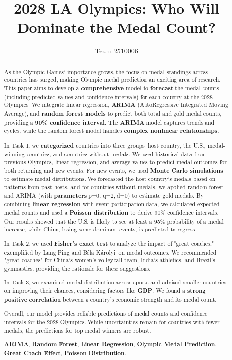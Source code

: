 \documentclass{mcmthesis}  %
\title{2028 LA Olympics: Who Will Dominate the Medal Count?}  %
\author{\small Team 2510006}  %
\begin{document}
\begin{abstract}  %

As the Olympic Games' importance grows, the focus on medal standings across countries has surged, making Olympic medal prediction an exciting area of research. This paper aims to develop a \textbf{comprehensive} model to \textbf{forecast} the medal counts (including predicted values and confidence intervals) for each country at the 2028 Olympics. We integrate linear regression, \textbf{ARIMA} (AutoRegressive Integrated Moving Average), and \textbf{random forest models} to predict both total and gold medal counts, providing a \textbf{90\% confidence interval}. The \textbf{ARIMA} model captures trends and cycles, while the random forest model handles \textbf{complex nonlinear relationships}.

In Task 1, we \textbf{categorized} countries into three groups: host country, the U.S., medal-winning countries, and countries without medals. We used historical data from previous Olympics, linear regression, and average values to predict medal outcomes for both returning and new events. For new events, we used \textbf{Monte Carlo simulations} to estimate medal distributions. We forecasted the host country's medals based on patterns from past hosts, and for countries without medals, we applied random forest and ARIMA (with \textbf{parameters} p=0, q=2, d=0) to estimate gold medals. By combining \textbf{linear regression} with event participation data, we calculated expected medal counts and used a \textbf{Poisson distribution} to derive 90\% confidence intervals. Our results showed that the U.S. is likely to see at least a 95\% probability of a medal increase, while China, losing some dominant events, is predicted to regress.

In Task 2, we used \textbf{Fisher's exact test} to analyze the impact of "great coaches," exemplified by Lang Ping and Béla Károlyi, on medal outcomes. We recommended "great coaches" for China’s women's volleyball team, India’s athletics, and Brazil’s gymnastics, providing the rationale for these suggestions.

In Task 3, we examined medal distribution across sports and advised smaller countries on improving their chances, considering factors like \textbf{GDP}. We found a \textbf{strong positive correlation} between a country’s economic strength and its medal count.

Overall, our model provides reliable predictions of medal counts and confidence intervals for the 2028 Olympics. While uncertainties remain for countries with fewer medals, the predictions for top medal winners are robust.


\begin{keywords}  %
\textbf{ARIMA}, \textbf{Random Forest}, \textbf{Linear Regression}, \textbf{Olympic Medal Prediction}, \textbf{Great Coach Effect}, \textbf{Poisson Distribution}.
\end{keywords}  %
\end{abstract}  %
\maketitle  %
\end{document}
